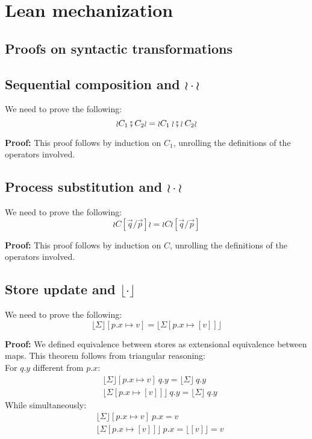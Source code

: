 \documentclass[12pt,a4paper,twoside]{book}
\begin{document}
\chapter{Lean mechanization}

\begin{appendices}
\chapter{Proofs on syntactic transformations}
\label{appdix:A}
\section{Sequential composition and $\wr \cdot \wr$}
We need to prove the following:
$$\wr C_1 \fatsemi C_2 \wr = \wr C_1 \wr \fatsemi \wr C_2 \wr$$

\noindent\textbf{Proof:}
This proof follows by induction on $C_1$, unrolling the definitions of the operators involved.

\section{Process substitution and $\wr \cdot \wr$}
We need to prove the following:
$$\wr C [\vec{q}/\vec{p}] \wr = \wr C \wr [\vec{q}/\vec{p}]$$

\noindent\textbf{Proof:}
This proof follows by induction on $C$, unrolling the definitions of the operators involved.

\section{Store update and $\lfloor \cdot \rfloor$}
We need to prove the following:
$$\lfloor \Sigma \rfloor[p.x \mapsto v] = \lfloor \Sigma[p.x \mapsto [v]] \rfloor$$

\noindent\textbf{Proof:}
We defined equivalence between stores as extensional equivalence between maps.
This theorem follows from triangular reasoning:\\
For $q.y$ different from $p.x$:
\begin{align*}
&\lfloor \Sigma \rfloor[p.x \mapsto v]~q.y = \lfloor \Sigma \rfloor~q.y\\
&\lfloor \Sigma [p.x \mapsto [v]] \rfloor~q.y = \lfloor \Sigma \rfloor~q.y
\end{align*}
While simultaneously:
\begin{align*}
&\lfloor \Sigma \rfloor[p.x \mapsto v]~p.x = v\\
&\lfloor \Sigma [p.x \mapsto [v]] \rfloor~p.x = \lfloor [v] \rfloor = v
\end{align*}



\end{appendices}
\end{document}
